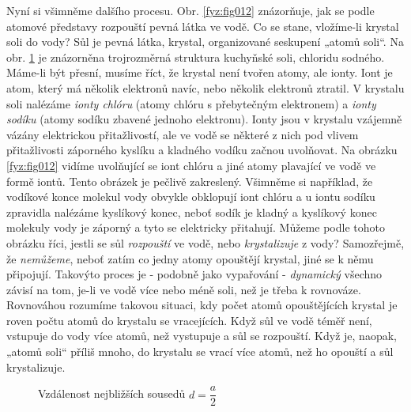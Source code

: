       Nyní si všimněme dalšího procesu. Obr. \ref{fyz:fig012} znázorňuje, jak se podle atomové 
      představy rozpouští pevná látka ve vodě. Co se stane, vložíme-li krystal soli do vody? Sůl je 
      pevná látka, krystal, organizované seskupení „atomů soli“. Na obr. \ref{fyz:fig013} je 
      znázorněna trojrozměrná struktura kuchyňské soli, chloridu sodného. Máme-li být přesní, 
      musíme říct, že krystal není tvořen atomy, ale ionty. Iont je atom, který má několik 
      elektronů navíc, nebo několik elektronů ztratil. V krystalu soli nalézáme \emph{ionty chlóru} 
      (atomy chlóru s přebytečným elektronem) a \emph{ionty sodíku} (atomy sodíku zbavené jednoho 
      elektronu). Ionty jsou v krystalu vzájemně vázány elektrickou přitažlivostí, ale ve vodě se 
      některé z nich pod vlivem přitažlivosti záporného kyslíku a kladného vodíku začnou uvolňovat. 
      Na obrázku \ref{fyz:fig012} vidíme uvolňující se iont chlóru a jiné atomy plavající ve vodě 
      ve formě iontů. Tento obrázek je pečlivě zakreslený. Všimněme si například, že vodíkové konce 
      molekul vody obvykle obklopují iont chlóru a u iontu sodíku zpravidla nalézáme kyslíkový 
      konec, neboť sodík je kladný a kyslíkový konec molekuly vody je záporný a tyto se elektricky 
      přitahují. Můžeme podle tohoto obrázku říci, jestli se sůl \emph{rozpouští} ve vodě, nebo 
      \emph{krystalizuje} z vody? Samozřejmě, že \emph{nemůžeme}, neboť zatím co jedny atomy 
      opouštějí krystal, jiné se k němu připojují. Takovýto proces je - podobně jako vypařování - 
      \emph{dynamický} všechno závisí na tom, je-li ve vodě více nebo méně soli, než je třeba k 
      rovnováze. Rovnováhou rozumíme takovou situaci, kdy počet atomů opouštějících krystal je 
      roven počtu atomů do krystalu se vracejících. Když sůl ve vodě téměř není, vstupuje do vody 
      více atomů, než vystupuje a sůl se rozpouští. Když je, naopak, „atomů soli“ příliš mnoho, do 
      krystalu se vrací více atomů, než ho opouští a sůl krystalizuje.
 
      \begin{figure}[hbt!]  %
        \centering
             \newline                                   
        \caption{Vzdálenost nejbližších sousedů \(d = \dfrac{a}{2}\) \cite[s.~22]{Feynman01}}
        \label{fyz:fig013}
      \end{figure}
      
